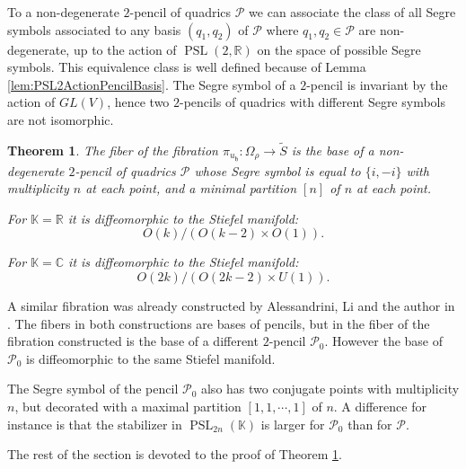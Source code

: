 \documentclass[reqno,10pt]{amsart}
\theoremstyle{plain}
\newtheorem{thm}{Theorem}[section]
\theoremstyle{definition}
\theoremstyle{remark}
\newcommand{\R}{\mathbb{R}}
\newcommand{\C}{\mathbb{C}}
\newcommand{\K}{\mathbb{K}}
\DeclareMathOperator{\PSL}{PSL}
\begin{document}
To a non-degenerate $2$-pencil of quadrics $\mathcal{P}$ we can associate the class of all Segre symbols associated to any basis $(q_1,q_2)$ of $\mathcal{P}$ where $q_1,q_2\in \mathcal{P}$ are non-degenerate, up to the action of $\PSL(2,\R)$ on the space of possible Segre symbols. This equivalence class is well defined because of Lemma \ref{lem:PSL2ActionPencilBasis}. The Segre symbol of a $2$-pencil is invariant by the action of $GL(V)$, hence two $2$-pencils of quadrics with different Segre symbols are not isomorphic.

\begin{thm}
\label{thm:ADL}
The fiber of the fibration $\pi_{u_\mathfrak{h}}:\Omega_\rho\to \widetilde{S}$ is the base of a non-degenerate $2$-pencil of quadrics $\mathcal{P}$ whose Segre symbol is equal to $\lbrace i, -i\rbrace$ with multiplicity $n$ at each point, and a minimal partition $[n]$ of $n$ at each point. 

\medskip

For $\K=\R$ it is diffeomorphic to the Stiefel manifold:
$$O(k)/\left(O(k-2)\times O(1)\right).$$ 

For $\K=\C$ it is diffeomorphic to the Stiefel manifold: $$O(2k)/\left(O(2k-2)\times U(1)\right).$$
\end{thm} 

A similar fibration was already constructed by Alessandrini, Li and the author in \cite{ADL}. The fibers in both constructions are bases of pencils, but in \cite{ADL} the fiber of the fibration constructed is the base of a different $2$-pencil $\mathcal{P}_0$. However the base of $\mathcal{P}_0$ is diffeomorphic to the same Stiefel manifold.

\medskip

The Segre symbol of the pencil $\mathcal{P}_0$ also has two conjugate points with multiplicity $n$, but decorated with a maximal partition $[1,1,\cdots,1]$ of $n$. A difference for instance is that the stabilizer in $\PSL_{2n}(\K)$ is larger for $\mathcal{P}_0$ than for $\mathcal{P}$.

\medskip

The rest of the section is devoted to the proof of Theorem \ref{thm:ADL}.

\medskip
\end{document}
